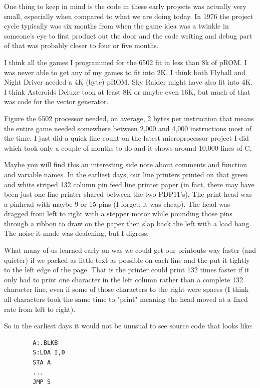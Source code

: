 One thing to keep in mind is the code in these early projects was actually very small, especially when compared to what we are doing today. In 1976 the project cycle typically was six months from when the game idea was a twinkle in someone's eye to first product out the door and the code writing and debug part of that was probably closer to four or five months. 

I think all the games I programmed for the 6502 fit in less than 8k of pROM. I was never able to get any of my games to fit into 2K. I think both Flyball and Night Driver needed a 4K (byte) pROM. Sky Raider might have also fit into 4K. I think Asteroids Deluxe took at least 8K or maybe even 16K, but much of that was code for the vector generator. 

Figure the 6502 processor needed, on average, 2 bytes per instruction that means the entire game needed somewhere between 2,000 and 4,000 instructions most of the time. I just did a quick line count on the latest microprocessor project I did which took only a couple of months to do and it shows around 10,000 lines of C. 

Maybe you will find this an interesting side note about comments and function and variable names. In the earliest days, our line printers printed on that green and white striped 132 column pin feed line printer paper (in fact, there may have been just one line printer shared between the two PDP11's). The print head was a pinhead with maybe 9 or 15 pins (I forget; it was cheap). The head was dragged from left to right with a stepper motor while pounding those pins through a ribbon to draw on the paper then slap back the left with a load bang. The noise it made was deafening, but I digress. 

What many of us learned early on was we could get our printouts way faster (and quieter) if we packed as little text as possible on each line and the put it tightly to the left edge of the page. That is the printer could print 132 times faster if it only had to print one character in the left column rather than a complete 132 character line, even if some of those characters to the right were spaces (I think all characters took the same time to "print" meaning the head moved at a fixed rate from left to right).

So in the earliest days it would not be unusual to see source code that looks like:

\begin{lstlisting}
        A:.BLKB
        S:LDA I,0
        STA A
        ...
        JMP S
\end{lstlisting}

